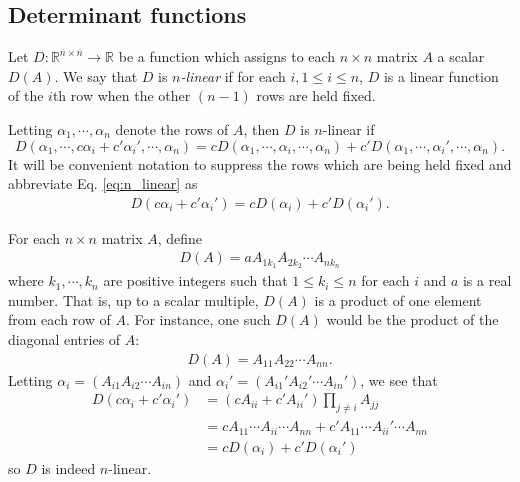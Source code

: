 \documentclass[12pt,letterpaper,reqno]{article}
\numberwithin{equation}{section}
\newcommand{\ti}[1]{\textit{#1}}
\begin{document}
\subsection{Determinant functions}
\begin{defn}
	Let $D:\mathbb{R}^{\overline{n} \times \overline{n}} \to \mathbb{R}$ be a function which assigns to each $n \times n$ matrix $A$ a scalar $D(A)$. We say that $D$ is \ti{$n$-linear} if for each $i, 1 \leq i \leq n$, $D$ is a linear function of the $i$th row when the other $(n-1)$ rows are held fixed.
	
	Letting $\alpha_1,\cdots,\alpha_n$ denote the rows of $A$, then $D$ is $n$-linear if 
	\begin{equation}\label{eq:n_linear}
	D(\alpha_1,\cdots,c\alpha_i+c'\alpha_i',\cdots,\alpha_n)=cD(\alpha_1,\cdots,\alpha_i,\cdots,\alpha_n)+c'D(\alpha_1,\cdots,\alpha_i',\cdots,\alpha_n).
	\end{equation} 
	It will be convenient notation to suppress the rows which are being held fixed and abbreviate Eq. \eqref{eq:n_linear} as 
	\begin{align*}
		D(c\alpha_i+c'\alpha_i')=cD(\alpha_i)+c'D(\alpha_i').
	\end{align*}
\end{defn}

\begin{example}\label{ex:n_linear_function}
For each $n \times n$ matrix $A$, define
\begin{align*}
	D(A)=aA_{1k_1}A_{2k_2}\cdots A_{nk_n}
\end{align*}
where $k_1,\cdots,k_n$ are positive integers such that $1 \leq k_i \leq n$ for each $i$ and $a$ is a real number. That is, up to a scalar multiple, $D(A)$ is a product of one element from each row of $A$. For instance, one such $D(A)$ would be the product of the diagonal entries of $A$:
\begin{align*}
	D(A)=A_{11}A_{22}\cdots A_{nn}.
\end{align*}
Letting $\alpha_i=(A_{i1}A_{i2}\cdots A_{in})$ and $\alpha_i'=(A_{i1}'A_{i2}'\cdots A_{in}')$, we see that
\begin{align*}
	D(c\alpha_i+c'\alpha_i')&=(cA_{ii}+c'A_{ii}')\prod_{j \neq i}A_{jj} \\
	&=cA_{11}\cdots A_{ii}\cdots A_{nn}+c'A_{11} \cdots A_{ii}'\cdots A_{nn} \\
	&=cD(\alpha_i)+c'D(\alpha_i')
\end{align*}
so $D$ is indeed $n$-linear. 
\end{example}
\end{document}
